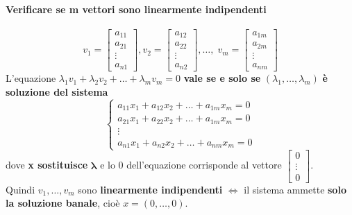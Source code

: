 \documentclass[a4paper, 12pt]{report}
\begin{document}
            \paragraph{Verificare se m vettori sono linearmente indipendenti}
                $$
                v_1=
                \begin{bmatrix}
                    a_{11}\\
                    a_{21}\\
                    \vdots\\
                    a_{n1}       
                \end{bmatrix}
                ,v_2=
                \begin{bmatrix}
                    a_{12}\\
                    a_{22}\\
                    \vdots\\
                    a_{n2} 
                \end{bmatrix}
                ,\dots,\;
                v_m=
                \begin{bmatrix}
                    a_{1m}\\
                    a_{2m}\\
                    \vdots\\
                    a_{nm} 
                \end{bmatrix}
                $$
                L'equazione $\lambda_1v_1+\lambda_2v_2+\dots+\lambda_mv_m=0$ \textbf{vale se e solo se} $(\lambda_1,\dots,\lambda_m)$ \textbf{è soluzione del sistema}
                $$
                    \begin{cases}
                        a_{11}x_1+a_{12}x_2+\dots+a_{1m}x_m = 0\\
                        a_{21}x_1+a_{22}x_2+\dots+a_{1m}x_m = 0\\
                        \vdots\\
                        a_{n1}x_1+a_{n2}x_2+\dots+a_{nm}x_m = 0
                    \end{cases}
                $$               
                dove \textbf{x sostituisce} $\boldsymbol{\lambda}$ e lo 0 dell'equazione corrisponde al vettore
                $
                \begin{bmatrix}
                    0\\
                    \vdots\\
                    0
                \end{bmatrix}
                $.\\
                Quindi $v_1,\dots,v_m$ sono \textbf{linearmente indipendenti} $\Leftrightarrow$ il sistema ammette \textbf{solo la soluzione banale}, cioè $x=(0,\dots,0)$.
\end{document}
